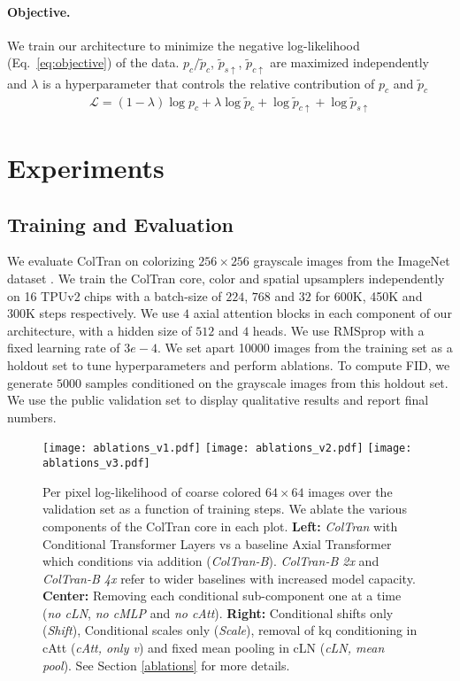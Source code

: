 \documentclass{article} \usepackage{iclr2021_conference,times}
\newcommand{\ua}{{\scriptscriptstyle\uparrow}}
\begin{document}
\paragraph{Objective.} We train our architecture to minimize the negative log-likelihood (Eq.~\ref{eq:objective}) of the data. $p_c/\widetilde{p}_c$, $\widetilde{p}_{s\ua}$, $\widetilde{p}_{c\ua}$ are maximized independently and $\lambda$ is a hyperparameter that controls the relative contribution of $p_c$ and $\widetilde{p}_c$
\begin{align}
    \mathcal{L} = (1-\lambda) \log p_{c} + \lambda \log \widetilde{p}_c + \log \widetilde{p}_{c\ua} + \log \widetilde{p}_{s\ua} \label{eq:objective}
\end{align}

\section{Experiments}

\subsection{Training and Evaluation}
We evaluate ColTran on colorizing $256 {\times} 256$ grayscale images from the ImageNet dataset \citep{russakovsky2015imagenet}. We train the ColTran core, color and spatial upsamplers independently on 16 TPUv2 chips with a batch-size of $224$, $768$ and $32$ for 600K, 450K and 300K steps respectively. We use $4$ axial attention blocks in each component of our architecture, with a hidden size of $512$ and $4$ heads. We use RMSprop \citep{tieleman2012lecture} with a fixed learning rate of $3e-4$. We set apart 10000 images from the training set as a holdout set to tune hyperparameters and perform ablations. To compute FID, we generate $5000$ samples conditioned on the grayscale images from this holdout set. We use the public validation set to display qualitative results and report final numbers. 

\begin{figure*}
\centering
\texttt{[image: ablations\_v1.pdf]} \hfill
\texttt{[image: ablations\_v2.pdf]} \hfill
\texttt{[image: ablations\_v3.pdf]}

\caption{Per pixel log-likelihood of coarse colored $64 \times 64$ images over the validation set as a function of training steps. We ablate the various components of the ColTran core in each plot. \textbf{Left:} \textit{ColTran} with Conditional Transformer Layers vs a baseline Axial Transformer which conditions via addition (\textit{ColTran-B}). \textit{ColTran-B 2x} and \textit{ColTran-B 4x} refer to wider baselines with increased model capacity. \textbf{Center:} Removing each conditional sub-component one at a time (\textit{no cLN}, \textit{no cMLP} and \textit{no cAtt}). \textbf{Right:} Conditional shifts only (\textit{Shift}), Conditional scales only (\textit{Scale}), removal of kq conditioning in cAtt (\textit{cAtt, only v}) and fixed mean pooling in cLN (\textit{cLN, mean pool}). See Section \ref{ablations} for more details.}
\label{fig:ablation_v1}
\end{figure*}
\end{document}
